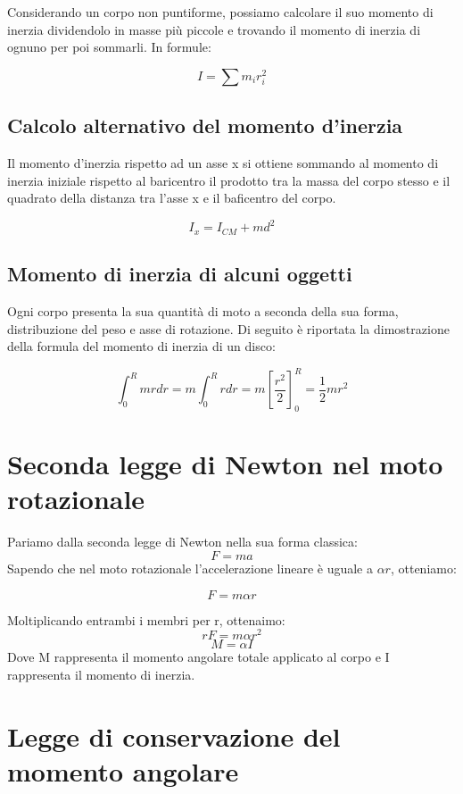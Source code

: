 \documentclass[10pt,a4paper]{article}
\begin{document}
	Considerando un corpo non puntiforme, possiamo calcolare il suo momento di inerzia dividendolo in masse più piccole e trovando il momento di inerzia di ognuno per poi sommarli. In formule:

	\begin{definition}
		\begin{equation}
			I = \sum m_i r_i^2
		\end{equation}
	\end{definition}

	\subsection{Calcolo alternativo del momento d'inerzia}

	Il momento d'inerzia rispetto ad un asse x si ottiene sommando al momento di inerzia iniziale rispetto al baricentro il prodotto tra la massa del corpo stesso e il quadrato della distanza tra l'asse x e il baficentro del corpo.

	\begin{definition}
		\begin{equation}
		I_x = I_{CM} + md^2
		\end{equation}
	\end{definition}

	\subsection{Momento di inerzia di alcuni oggetti}

	Ogni corpo presenta la sua quantità di moto a seconda della sua forma, distribuzione del peso e asse di rotazione. Di seguito è riportata la dimostrazione della formula del momento di inerzia di un disco:

	\begin{equation}
		\int_{0}^{R} mr dr = m \int_{0}^{R} r dr = m [\frac{r^2}{2}]_0^R = \frac{1}{2}mr^2
	\end{equation}

	\section{Seconda legge di Newton nel moto rotazionale}

	Pariamo dalla seconda legge di Newton nella sua forma classica:
	$$F=ma$$
Sapendo che nel moto rotazionale l'accelerazione lineare è uguale a $\alpha r$, otteniamo:

$$F=m \alpha r$$

Moltiplicando entrambi i membri per r, ottenaimo:
$$r F = m \alpha r^2$$
$$M = \alpha I$$
Dove M rappresenta il momento angolare totale applicato al corpo e I rappresenta il momento di inerzia.

\section{Legge di conservazione del momento angolare}
\end{document}
